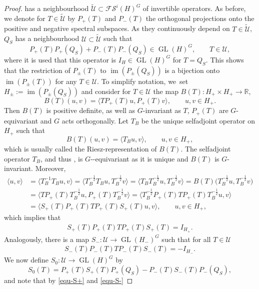 \documentclass[10pt,a4paper]{amsart}
\providecommand{\nobreakdash}{\nobreak\hbox{-}}
\DeclareMathOperator{\GL}{GL}
\DeclareMathOperator{\im}{im}
\begin{document}
\begin{proof}
has a neighbourhood $\tilde{\mathcal{U}}\subset\mathcal{FS}^i(H)^G$ of invertible operators. As before, we denote for $T\in\tilde{\mathcal{U}}$ by $P_+(T)$ and $P_-(T)$ the orthogonal projections onto the positive and negative spectral subspaces. As they continuously depend on $T\in\tilde{\mathcal{U}}$, $Q_S$ has a neighbourhood $\mathcal{U}\subset\tilde{\mathcal{U}}$ such that
\[P_+(T) P_+(Q_S)+P_-(T) P_-(Q_S)\in\GL(H)^G,\qquad T\in \mathcal{U},\]
where it is used that this operator is $I_H\in\GL(H)^G$ for $T=Q_S$. This shows that the restriction of $P_\pm(T)$ to $\im(P_\pm(Q_S))$ is a bijection onto $\im(P_\pm(T))$ for any $T\in\mathcal{U}$. To simplify notation, we~set $H_\pm:=\im(P_\pm(Q_S))$ and consider for $T\in\mathcal{U}$ the map $B(T) \colon H_+\times H_+\rightarrow\mathbb{R}$,
\[B(T)(u,v)=\langle TP_+(T)u,P_+(T)v\rangle,\qquad u,v\in H_+.\]
Then $B(T)$ is positive definite, as well as $G$-invariant as $T$, $P_+(T)$ are $G$-equivariant and $G$ acts orthogonally. Let $T_B$ be the unique selfadjoint operator on $H_+$ such that
\[B(T)(u,v)=\langle T_Bu,v\rangle,\qquad u,v\in H_+,\]
which is usually called the Riesz-representation of $B(T)$. The selfadjoint operator $T_B$, and thus , is $G$\nobreakdash-equiv\-ari\-ant as it is unique and $B(T)$ is $G$-invariant. Moreover,
\begin{align*}
\langle u,v\rangle&=\bigl\langle T_B^{-1}T_Bu,v\bigr\rangle=\bigl\langle T_B^{-\frac{1}{2}}T_Bu,T_B^{-\frac{1}{2}}v\bigr\rangle=\bigl\langle T_BT_B^{-\frac{1}{2}}u,T_B^{-\frac{1}{2}}v\bigr\rangle=B(T)\bigl(T_B^{-\frac{1}{2}}u,T_B^{-\frac{1}{2}}v\bigr)\\
&=\bigl\langle TP_+(T)T_B^{-\frac{1}{2}}u,P_+(T)T_B^{-\frac{1}{2}}v\bigr\rangle=\bigl\langle T_B^{-\frac{1}{2}}P_+(T)TP_+(T)T_B^{-\frac{1}{2}}u,v\bigr\rangle\\
&=\langle S_+(T)P_+(T)TP_+(T)S_+(T)u,v\rangle,\qquad u,v\in H_+,
\end{align*}
which implies that
\begin{align}\label{equ-S+}
S_+(T)P_+(T)TP_+(T)S_+(T)=I_{H_+}.
\end{align}
Analogously, there is a map $S_- \colon \mathcal{U}\rightarrow\GL(H_-)^G$ such that for all $T\in\mathcal{U}$
\begin{align}\label{equ-S-}
S_-(T)P_-(T) TP_-(T)S_-(T)=-I_{H_-}.
\end{align}
We now define $S_0 \colon \mathcal{U}\rightarrow\GL(H)^G$ by
\[S_0(T)=P_+(T)S_+(T)P_+(Q_S)-P_-(T)S_-(T)P_-(Q_S),\]
and note that by \eqref{equ-S+} and \eqref{equ-S-}

\end{proof}
\end{document}
